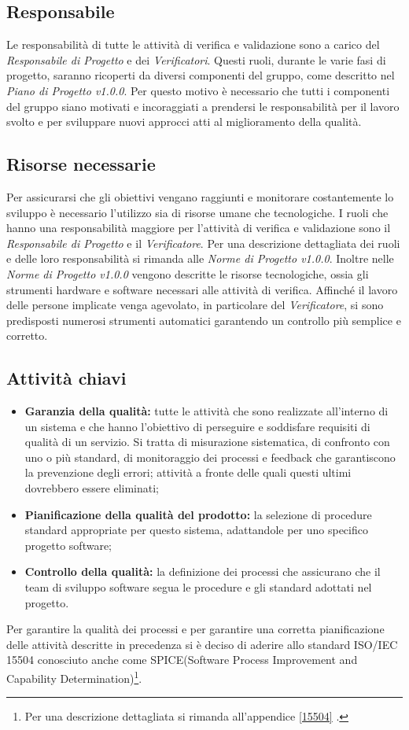 \subsection{Responsabile}
Le responsabilità di tutte le attività di verifica e validazione sono a carico del \textit{Responsabile di Progetto} e dei \textit{Verificatori}. Questi ruoli, durante le varie fasi di progetto, saranno ricoperti da diversi componenti del gruppo, come descritto nel \textit{Piano di Progetto v1.0.0}. Per questo motivo è necessario che tutti i componenti del gruppo siano motivati e incoraggiati a prendersi le responsabilità per il lavoro svolto e per sviluppare nuovi approcci atti al miglioramento della qualità.

\subsection{Risorse necessarie}
Per assicurarsi che gli obiettivi vengano raggiunti e monitorare costantemente lo sviluppo è necessario l'utilizzo sia di risorse umane che tecnologiche. I ruoli che hanno una responsabilità maggiore per l'attività di verifica e validazione sono il \textit{Responsabile di Progetto} e il \textit{Verificatore}. Per una descrizione dettagliata dei ruoli e delle loro responsabilità si rimanda alle \textit{Norme di Progetto v1.0.0}. Inoltre nelle \textit{Norme di Progetto v1.0.0} vengono descritte le risorse tecnologiche, ossia gli strumenti hardware e software necessari alle attività di verifica. Affinché il lavoro delle persone implicate venga agevolato, in particolare del \textit{Verificatore}, si sono predisposti numerosi strumenti automatici garantendo un controllo più semplice e corretto.

\subsection{Attività chiavi}
\begin{itemize}
	\item \textbf{Garanzia della qualità:} tutte le attività che sono realizzate all'interno di un sistema e che hanno l'obiettivo di perseguire e soddisfare requisiti di qualità di un servizio. Si tratta di misurazione sistematica, di confronto con uno o più standard, di monitoraggio dei processi e feedback che garantiscono la prevenzione degli errori; attività a fronte delle quali questi ultimi dovrebbero essere eliminati;
	\item \textbf{Pianificazione della qualità del prodotto:} la selezione di procedure standard appropriate per questo sistema, adattandole per uno specifico progetto software;
	\item \textbf{Controllo della qualità:} la definizione dei processi che assicurano che il team  di sviluppo software segua le procedure e gli standard adottati nel progetto.
\end{itemize}
Per garantire la qualità dei processi e per garantire una corretta pianificazione delle attività descritte in precedenza si è deciso di aderire allo standard ISO/IEC 15504 conosciuto anche come SPICE(Software Process Improvement and Capability Determination)\footnote{Per una descrizione dettagliata si rimanda all'appendice \ref{15504} .}.

